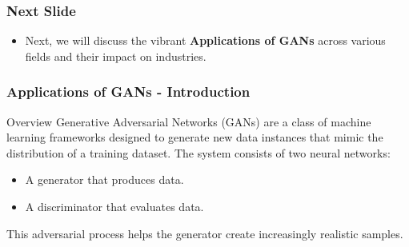 \documentclass[aspectratio=169]{beamer}
\begin{document}
\begin{frame}[fragile]
    \frametitle{Next Slide}
    \begin{itemize}
        \item Next, we will discuss the vibrant \textbf{Applications of GANs} across various fields and their impact on industries.
    \end{itemize}
\end{frame}

\begin{frame}[fragile]
    \frametitle{Applications of GANs - Introduction}
    \begin{block}{Overview}
        Generative Adversarial Networks (GANs) are a class of machine learning frameworks designed to generate new data instances that mimic the distribution of a training dataset. 
        The system consists of two neural networks:
        \begin{itemize}
            \item A generator that produces data.
            \item A discriminator that evaluates data.
        \end{itemize}
        This adversarial process helps the generator create increasingly realistic samples.
    \end{block}
\end{frame}
\end{document}
